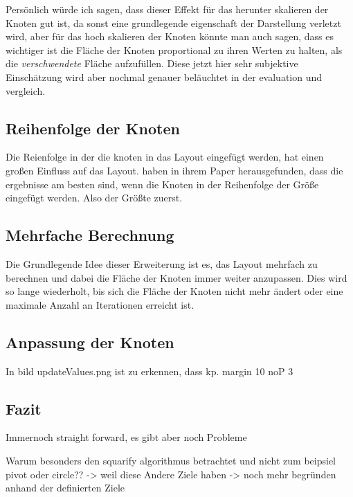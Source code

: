 Persönlich würde ich sagen, dass dieser Effekt für das herunter skalieren der Knoten gut ist, da sonst eine grundlegende eigenschaft der Darstellung verletzt wird, aber für das hoch skalieren der Knoten könnte man auch sagen, dass es wichtiger ist die Fläche der Knoten proportional zu ihren Werten zu halten, als die \textit{verschwendete} Fläche aufzufüllen. Diese jetzt hier sehr subjektive Einschätzung wird aber nochmal genauer beläuchtet in der evaluation und vergleich.

\subsection{Reihenfolge der Knoten} \label{sec:ReihenfolgeKnoten}
Die Reienfolge in der die knoten in das Layout eingefügt werden, hat einen großen Einfluss auf das Layout. \cite{johnson1991tree} haben in ihrem Paper herausgefunden, dass die ergebnisse am besten sind, wenn die Knoten in der Reihenfolge der Größe eingefügt werden. Also der Größte zuerst.

\subsection{Mehrfache Berechnung} \label{sec:MehrfacheBerechnung}
Die Grundlegende Idee dieser Erweiterung ist es, das Layout mehrfach zu berechnen und dabei die Fläche der Knoten immer weiter anzupassen. Dies wird so lange wiederholt, bis sich die Fläche der Knoten nicht mehr ändert oder eine maximale Anzahl an Iterationen erreicht ist.

\subsection{Anpassung der Knoten}
In bild updateValues.png ist zu erkennen, dass kp. margin 10 noP 3


\subsection{Fazit}
Immernoch straight forward, es gibt aber noch Probleme 

Warum besonders den squarify algorithmus betrachtet und nicht zum beipsiel pivot oder circle?? -> weil diese Andere Ziele haben -> noch mehr begründen anhand der definierten Ziele





